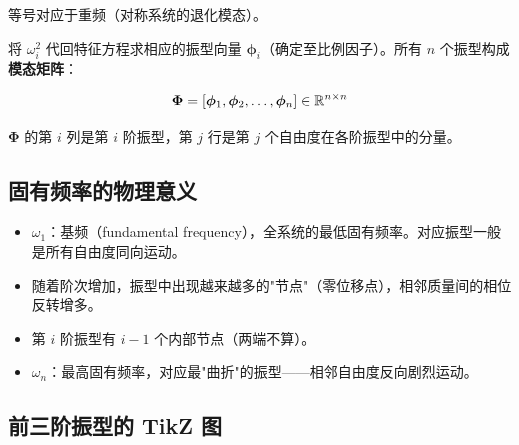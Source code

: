 等号对应于重频（对称系统的退化模态）。

将 $\omega_i^2$ 代回特征方程求相应的振型向量 $\bm{\phi}_i$（确定至比例因子）。所有 $n$ 个振型构成 \textbf{模态矩阵}：

\begin{myformula}
\[
\mathbf{\Phi} = [\bm{\phi}_1, \bm{\phi}_2, \ldots, \bm{\phi}_n] \in \mathbb{R}^{n\times n}
\]
\end{myformula}

$\mathbf{\Phi}$ 的第 $i$ 列是第 $i$ 阶振型，第 $j$ 行是第 $j$ 个自由度在各阶振型中的分量。

\subsection{固有频率的物理意义}

\begin{itemize}
\item $\omega_1$：基频（fundamental frequency），全系统的最低固有频率。对应振型一般是所有自由度同向运动。
\item 随着阶次增加，振型中出现越来越多的"节点"（零位移点），相邻质量间的相位反转增多。
\item 第 $i$ 阶振型有 $i-1$ 个内部节点（两端不算）。
\item $\omega_n$：最高固有频率，对应最"曲折"的振型——相邻自由度反向剧烈运动。
\end{itemize}

\subsection{前三阶振型的 TikZ 图}


